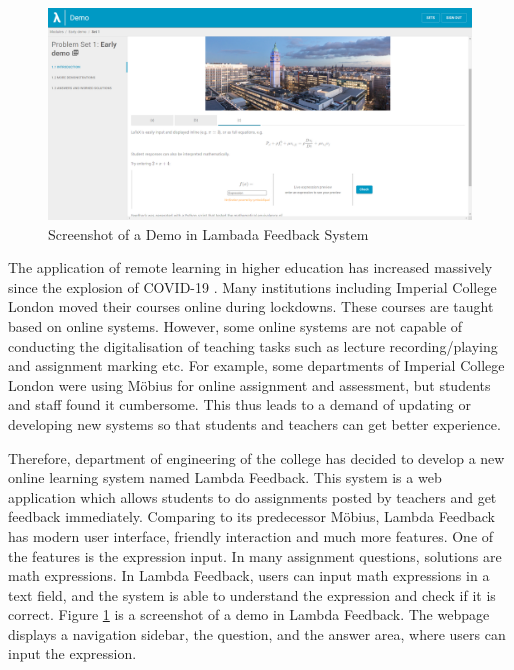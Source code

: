 \documentclass[12pt,twoside]{report}
\begin{document}
\begin{figure}
    \centering
    \includegraphics[width=\hsize]{figures/lambdafeedback-screenshot.png}
    \caption{Screenshot of a Demo in Lambada Feedback System}
    \label{fig:demoscreenshot}
\end{figure}

The application of remote learning in higher education has increased massively
since the explosion of COVID-19 \cite{remotelearning}. Many institutions including Imperial College
London moved their courses online during lockdowns. These courses are taught
based on online systems. However, some online systems are not capable of
conducting the digitalisation of teaching tasks such as lecture
recording/playing and assignment marking etc. For example, some departments of  Imperial College
London were using Möbius for online assignment and assessment, but students and staff found it cumbersome. This thus leads to a demand of updating or developing new systems so that students and teachers can get better experience.

Therefore, department of engineering of the college has decided to develop a new online learning system named
Lambda Feedback. This system is a web application which allows students to do assignments posted by teachers and get feedback immediately. Comparing to its predecessor Möbius, Lambda
Feedback has modern user interface, friendly interaction and much more features.
One of the features is the expression input. In many assignment questions,
solutions are math expressions. In Lambda Feedback, users can input math
expressions in a text field, and the system is able to understand the expression
and check if it is correct. Figure \ref{fig:demoscreenshot} is a screenshot of a
demo in Lambda Feedback. The webpage displays a navigation sidebar,
the question, and the answer area, where users can input the expression.
\end{document}
